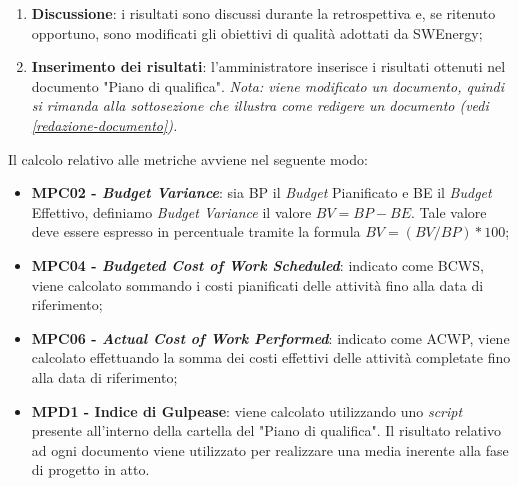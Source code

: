 \begin{itemize}
\begin{enumerate}
		      \item \textbf{Discussione}: i risultati sono discussi durante la
		            retrospettiva e, se ritenuto opportuno, sono modificati
		            gli obiettivi di qualità adottati da SWEnergy;

		      \item \textbf{Inserimento dei risultati}: l'amministratore
		            inserisce i risultati ottenuti nel documento "Piano di
		            qualifica".
		            \textit{Nota: viene modificato un documento, quindi si rimanda
		            alla sottosezione che illustra come redigere un documento
		            (vedi \cref{redazione-documento}).}
	      \end{enumerate}
\end{itemize}

Il calcolo relativo alle metriche avviene nel seguente modo:
\begin{itemize}
	\item \textbf{MPC02 - \textit{Budget Variance}}: sia BP il \textit{Budget} Pianificato e BE il \textit{Budget} Effettivo, definiamo \textit{Budget Variance} il valore $BV = BP - BE$.
		Tale valore deve essere espresso in percentuale tramite la formula $BV = (BV / BP) * 100$;
	\item \textbf{MPC04 - \textit{Budgeted Cost of Work Scheduled}}: indicato come BCWS, viene calcolato sommando i costi pianificati delle attività fino alla data di riferimento;
	\item \textbf{MPC06 - \textit{Actual Cost of Work Performed}}: indicato come ACWP, viene calcolato effettuando la somma dei costi effettivi delle attività completate fino alla data di riferimento;
	\item \textbf{MPD1 - Indice di Gulpease}: viene calcolato utilizzando uno \textit{script} presente all'interno della cartella del "Piano di qualifica". 
		Il risultato relativo ad ogni documento viene utilizzato per realizzare una media inerente alla fase di progetto in atto.
\end{itemize}
